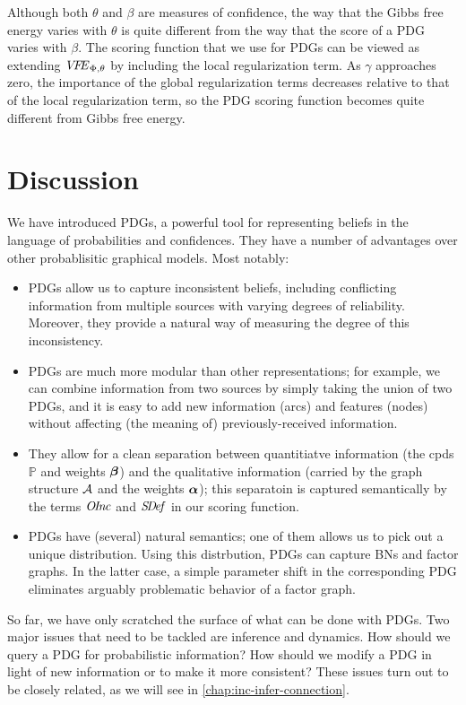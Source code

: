 Although both $\theta$ and $\beta$ are measures of confidence, 
the way that the Gibbs free energy varies with $\theta$ 
is quite different from the way that the score of a PDG
varies with $\beta$. 
The scoring function that we use for PDGs can be viewed as
extending ${\mathit{V\mkern-4mu F\mkern-4.5mu E}}_{\Phi,\theta}$ by including
the local regularization term.
As $\gamma$ approaches zero,
the importance of the global regularization terms decreases relative
to that of the local regularization term, so the PDG scoring function
becomes quite different from Gibbs free energy.

\section{Discussion}
We have introduced PDGs, a powerful tool for representing
beliefs in the language of probabilities and confidences.
They have a number of advantages over other
    probablisitic graphical models. 
Most notably:
\begin{itemize}
\item PDGs allow us to capture inconsistent beliefs, including conflicting information from multiple sources with varying degrees of reliability.
    Moreover, they provide a natural way of measuring the degree of this inconsistency. 
\item 
	PDGs are much more modular 
	than other representations; for example, we can combine information from two sources by simply taking the union of two
	PDGs, and it is easy to add new information (arcs)
	and features (nodes) without affecting 
    (the meaning of)
    previously-received information.
\item They allow for a clean separation between quantitiatve information (the
	cpds $\mathbb P$ and weights $\boldsymbol\beta$) and the qualitative information (carried by
	the graph structure $\mathcal A$ and the weights $\boldsymbol\alpha$); 
	this separatoin is captured semantically by the
	terms $\mathit{O\mskip-2.5muI\mskip-3.5mun\mskip-1.7muc}$ and $\mathit{S\mskip-3.5muD\mskip-2.5mue\mskip-1.5muf}$ in our scoring function.
\item PDGs have (several) natural semantics; one of them allows us to
pick out a unique distribution.  Using this distrbution, PDGs
	can capture BNs and factor graphs.
    In the latter case, a simple parameter shift in the corresponding PDG eliminates arguably problematic behavior of a factor graph.
\end{itemize}

So far, we have only scratched the surface of what can be done with PDGs.
Two major issues that need to be tackled are inference and dynamics.
How should we query a PDG for probabilistic information? 
How should we modify a PDG in light of new information or to make it more consistent?
These issues turn out to be closely related, as we will see in 
    \cref{chap:inc-infer-connection}.

